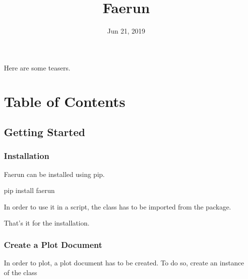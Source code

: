 \documentclass[letterpaper,10pt,english]{sphinxmanual}
\title{Faerun}
\date{Jun 21, 2019}
\author{}
\begin{document}
\pagestyle{empty}
\sphinxmaketitle
\pagestyle{plain}
\sphinxtableofcontents
\pagestyle{normal}
\label{\detokenize{index::doc}}


Here are some teasers.

\noindent{}

\noindent{}


\chapter{Table of Contents}
\label{\detokenize{index:table-of-contents}}

\section{Getting Started}
\label{\detokenize{tutorial:getting-started}}\label{\detokenize{tutorial::doc}}

\subsection{Installation}
\label{\detokenize{tutorial:installation}}
Faerun can be installed using pip.

\begin{sphinxVerbatim}[commandchars=\\\{\}]
pip install faerun
\end{sphinxVerbatim}

In order to use it in a script, the class  has to be imported from the package.

\begin{sphinxVerbatim}[commandchars=\\\{\}]
   
\end{sphinxVerbatim}

That’s it for the installation.


\subsection{Create a Plot Document}
\label{\detokenize{tutorial:create-a-plot-document}}
In order to plot, a plot document has to be created. To do so, create an instance of the class 

\begin{sphinxVerbatim}[commandchars=\\\{\}]
   

     
\end{sphinxVerbatim}
\end{document}
